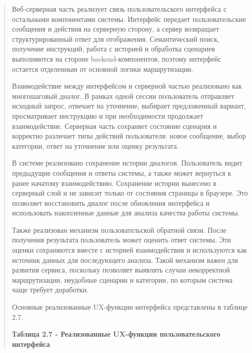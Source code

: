 \begin{quote}
Веб-серверная часть реализует связь пользовательского интерфейса с
остальными компонентами системы. Интерфейс передает пользовательские
сообщения и действия на серверную сторону, а сервер возвращает
структурированный ответ для отображения. Семантический поиск, получение
инструкций, работа с историей и обработка сценариев выполняются на
стороне backend-компонентов, поэтому интерфейс остается отделенным от
основной логики маршрутизации.

Взаимодействие между интерфейсом и серверной частью реализовано как
многошаговый диалог. В рамках одной сессии пользователь отправляет
исходный запрос, отвечает на уточнение, выбирает предложенный вариант,
просматривает инструкцию и при необходимости продолжает взаимодействие.
Серверная часть сохраняет состояние сценария и корректно различает типы
действий пользователя: новое сообщение, выбор категории, ответ на
уточнение или оценку результата.

В системе реализовано сохранение истории диалогов. Пользователь видит
предыдущие сообщения и ответы системы, а также может вернуться к ранее
начатому взаимодействию. Сохранение истории вынесено в серверный слой и
не зависит только от состояния страницы в браузере. Это позволяет
восстановить диалог после обновления интерфейса и использовать
накопленные данные для анализа качества работы системы.

Также реализован механизм пользовательской обратной связи. После
получения результата пользователь может оценить ответ системы. Эти
оценки сохраняются вместе с историей взаимодействия и используются как
источник данных для последующего анализа. Такой механизм важен для
развития сервиса, поскольку позволяет выявлять случаи некорректной
маршрутизации, неудобные сценарии и категории, по которым система чаще
требует доработки.

Основные реализованные UX-функции интерфейса представлены в таблице 2.7.

\textbf{Таблица 2.7 - Реализованные UX-функции пользовательского
интерфейса}
\end{quote}

